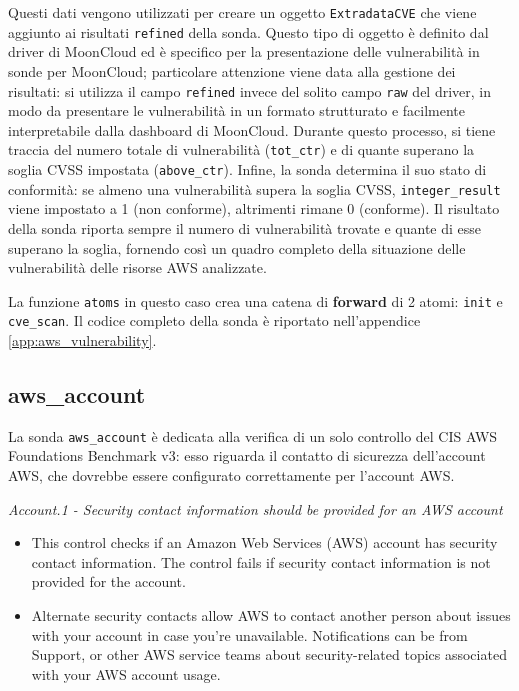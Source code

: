 Questi dati vengono utilizzati per creare un oggetto \texttt{ExtradataCVE} che viene aggiunto ai risultati \texttt{refined} della sonda. Questo tipo di oggetto è definito dal driver di MoonCloud ed è specifico per la presentazione delle vulnerabilità in sonde per MoonCloud; particolare attenzione viene data alla gestione dei risultati: si utilizza il campo \texttt{refined} invece del solito campo \texttt{raw} del driver, in modo da presentare le vulnerabilità in un formato strutturato e facilmente interpretabile dalla dashboard di MoonCloud. Durante questo processo, si tiene traccia del numero totale di vulnerabilità (\texttt{tot\_ctr}) e di quante superano la soglia CVSS impostata (\texttt{above\_ctr}). Infine, la sonda determina il suo stato di conformità: se almeno una vulnerabilità supera la soglia CVSS, \texttt{integer\_result} viene impostato a 1 (non conforme), altrimenti rimane 0 (conforme). Il risultato della sonda riporta sempre il numero di vulnerabilità trovate e quante di esse superano la soglia, fornendo così un quadro completo della situazione delle vulnerabilità delle risorse AWS analizzate.

La funzione \texttt{atoms} in questo caso crea una catena di \textbf{forward} di 2 atomi: \texttt{init} e \texttt{cve\_scan}. Il codice completo della sonda è riportato nell'appendice \ref{app:aws_vulnerability}.

\subsection{aws\_account}
\label{sec:account}

La sonda \texttt{aws\_account} è dedicata alla verifica di un solo controllo del CIS AWS Foundations Benchmark v3: esso riguarda il contatto di sicurezza dell'account AWS, che dovrebbe essere configurato correttamente per l'account AWS. 

\begin{mdframed}[backgroundcolor=gray!05, linecolor=gray!50]
\itshape
Account.1 - Security contact information should be provided for an AWS account
    \begin{itemize}
        \item This control checks if an Amazon Web Services (AWS) account has security contact information. The control fails if security contact information is not provided for the account.
        \item Alternate security contacts allow AWS to contact another person about issues with your account in case you're unavailable. Notifications can be from Support, or other AWS service teams about security-related topics associated with your AWS account usage.
    \end{itemize}
\end{mdframed}

